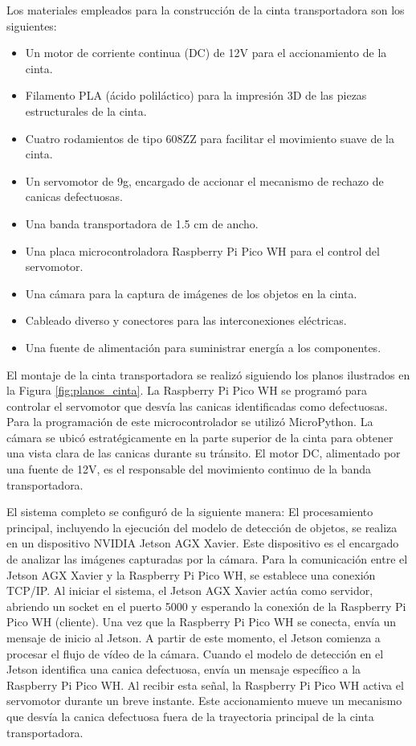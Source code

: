 \documentclass[11pt,spanish,listoffigures,listoftables]{tfgetsinf}
\begin{document}
Los materiales empleados para la construcción de la cinta transportadora son los siguientes:

\begin{itemize}
   \item Un motor de corriente continua (DC) de 12V para el accionamiento de la cinta.
   \item Filamento PLA (ácido poliláctico) para la impresión 3D de las piezas estructurales de la cinta.
   \item Cuatro rodamientos de tipo 608ZZ para facilitar el movimiento suave de la cinta.
   \item Un servomotor de 9g, encargado de accionar el mecanismo de rechazo de canicas defectuosas.
   \item Una banda transportadora de 1.5 cm de ancho.
   \item Una placa microcontroladora Raspberry Pi Pico WH para el control del servomotor.
   \item Una cámara para la captura de imágenes de los objetos en la cinta.
   \item Cableado diverso y conectores para las interconexiones eléctricas.
   \item Una fuente de alimentación para suministrar energía a los componentes.
\end{itemize}

El montaje de la cinta transportadora se realizó siguiendo los planos ilustrados en la Figura \ref{fig:planos_cinta}. La Raspberry Pi Pico WH se programó para controlar el servomotor que desvía las canicas identificadas como defectuosas. Para la programación de este microcontrolador se utilizó MicroPython\cite{micropython_home}. La cámara se ubicó estratégicamente en la parte superior de la cinta para obtener una vista clara de las canicas durante su tránsito. El motor DC, alimentado por una fuente de 12V, es el responsable del movimiento continuo de la banda transportadora.

El sistema completo se configuró de la siguiente manera:
El procesamiento principal, incluyendo la ejecución del modelo de detección de objetos, se realiza en un dispositivo NVIDIA Jetson AGX Xavier. Este dispositivo es el encargado de analizar las imágenes capturadas por la cámara.
Para la comunicación entre el Jetson AGX Xavier y la Raspberry Pi Pico WH, se establece una conexión TCP/IP. Al iniciar el sistema, el Jetson AGX Xavier actúa como servidor, abriendo un socket en el puerto 5000 y esperando la conexión de la Raspberry Pi Pico WH (cliente).
Una vez que la Raspberry Pi Pico WH se conecta, envía un mensaje de inicio al Jetson. A partir de este momento, el Jetson comienza a procesar el flujo de vídeo de la cámara.
Cuando el modelo de detección en el Jetson identifica una canica defectuosa, envía un mensaje específico a la Raspberry Pi Pico WH.
Al recibir esta señal, la Raspberry Pi Pico WH activa el servomotor durante un breve instante. Este accionamiento mueve un mecanismo que desvía la canica defectuosa fuera de la trayectoria principal de la cinta transportadora.
\end{document}
